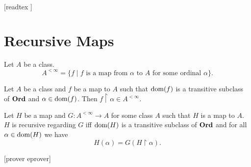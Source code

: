 \documentclass[10pt]{article}
\begin{document}
  \begin{imports}
    \begin{forthel}
      [readtex ]
    \end{forthel}
  \end{imports}


  \section*{Recursive Maps}

  \begin{forthel}
    \begin{definition}[id=SET_THEORY_04_1955917673267200,printid]
      Let $A$ be a class.
      \[ A^{< \infty} = \{f \mid \text{$f$ is a map from $\alpha$ to $A$ for some ordinal $\alpha$} \}. \]
    \end{definition}
  \end{forthel}

  \begin{forthel}
    \begin{proposition}[id=SET_THEORY_04_7841726894964736,printid]
      Let $A$ be a class and $f$ be a map to $A$ such that $\operatorname{dom}(f)$ is a transitive subclass of $\textbf{Ord}$ and $\alpha \in \operatorname{dom}(f)$.
      Then $f \restriction \alpha \in A^{< \infty}$.
    \end{proposition}
  \end{forthel}

  \begin{forthel}
    \begin{definition}[id=SET_THEORY_04_5597213870784512,printid]
      Let $H$ be a map and $G : A^{< \infty} \to A$ for some class $A$ such that $H$ is a map to $A$.
      $H$ is recursive regarding $G$ iff $\operatorname{dom}(H)$ is a transitive subclass of $\textbf{Ord}$ and for all $\alpha \in \operatorname{dom}(H)$ we have \[ H(\alpha) = G(H \restriction \alpha). \]
    \end{definition}
    [prover eprover]
  \end{forthel}
\end{document}
